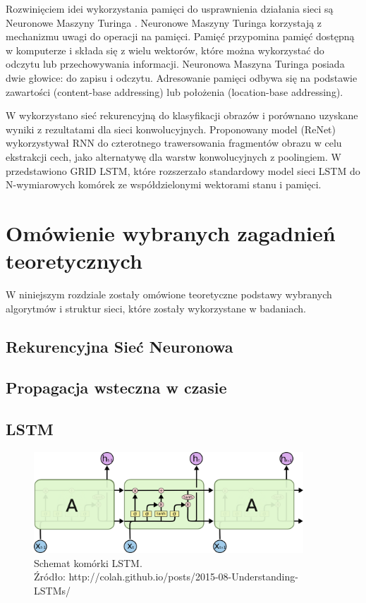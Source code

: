 \documentclass[oneside, mag]{mgr}
\begin{document}
Rozwinięciem idei wykorzystania pamięci do usprawnienia działania sieci są Neuronowe Maszyny Turinga \cite{DBLP:journals/corr/GravesWD14}. Neuronowe Maszyny Turinga korzystają z mechanizmu uwagi do operacji na pamięci. Pamięć przypomina pamięć dostępną w komputerze i składa się z wielu wektorów, które można wykorzystać do odczytu lub przechowywania informacji. Neuronowa Maszyna Turinga posiada dwie głowice: do zapisu i odczytu. Adresowanie pamięci odbywa się na podstawie zawartości (content-base addressing) lub położenia (location-base addressing).

W \cite{DBLP:journals/corr/VisinKCMCB15} wykorzystano sieć rekurencyjną do klasyfikacji obrazów i porównano uzyskane wyniki z rezultatami dla sieci konwolucyjnych. Proponowany model (ReNet) wykorzystywał RNN do czterotnego trawersowania fragmentów obrazu w celu ekstrakcji cech, jako alternatywę dla warstw konwolucyjnych z poolingiem. W \cite{DBLP:journals/corr/KalchbrennerDG15} przedstawiono GRID LSTM, które rozszerzało standardowy model sieci LSTM do N-wymiarowych komórek ze współdzielonymi wektorami stanu i pamięci.

\chapter{Omówienie wybranych zagadnień teoretycznych}

W niniejszym rozdziale zostały omówione teoretyczne podstawy wybranych algorytmów i struktur sieci, które zostały wykorzystane w badaniach.

\section{Rekurencyjna Sieć Neuronowa}

\section{Propagacja wsteczna w czasie}

\section{LSTM}

\begin{figure}
\centering
	\includegraphics[width=0.90\textwidth]{img/lstm_colah.png}
	\caption{Schemat komórki LSTM.\\ Źródło: http://colah.github.io/posts/2015-08-Understanding-LSTMs/}
	\label{fig:lstm}
\end{figure}
\end{document}
